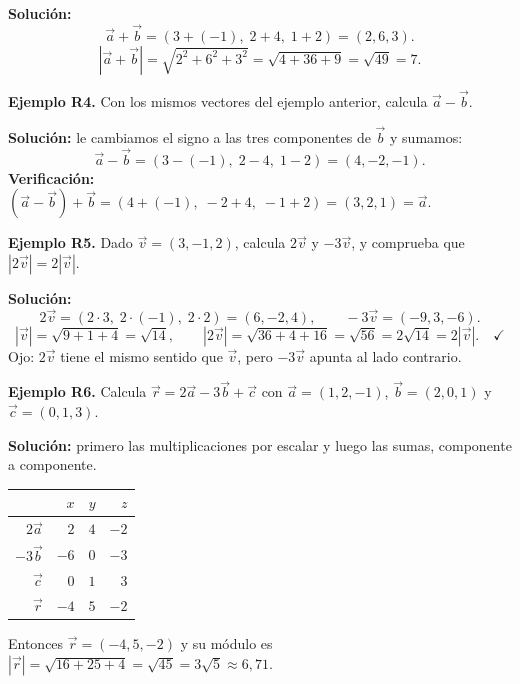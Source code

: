\documentclass[12pt, letterpaper]{article}
\begin{document}
\begin{cuadrosolucion}
  \textbf{Solución:}
  $$\vec{a} + \vec{b} = (3 + (-1),\; 2 + 4,\; 1 + 2) = (2, 6, 3).$$
  $$|\vec{a} + \vec{b}| = \sqrt{2^2 + 6^2 + 3^2} = \sqrt{4 + 36 + 9} = \sqrt{49} = 7.$$
\end{cuadrosolucion}

\textbf{Ejemplo R4.} Con los mismos vectores del ejemplo anterior, calcula $\vec{a} - \vec{b}$.

\begin{cuadrosolucion}
  \textbf{Solución:} le cambiamos el signo a las tres componentes de $\vec{b}$ y sumamos:
  $$\vec{a} - \vec{b} = (3 - (-1),\; 2 - 4,\; 1 - 2) = (4, -2, -1).$$
  \textbf{Verificación:} $(\vec{a}-\vec{b}) + \vec{b} = (4 + (-1),\; -2 + 4,\; -1 + 2) = (3, 2, 1) = \vec{a}$. \checkmark
\end{cuadrosolucion}

\textbf{Ejemplo R5.} Dado $\vec{v} = (3, -1, 2)$, calcula $2\vec{v}$ y $-3\vec{v}$, y comprueba que $|2\vec{v}| = 2|\vec{v}|$.

\begin{cuadrosolucion}
  \textbf{Solución:}
  $$2\vec{v} = (2 \cdot 3,\; 2 \cdot (-1),\; 2 \cdot 2) = (6, -2, 4), \qquad -3\vec{v} = (-9, 3, -6).$$
  $$|\vec{v}| = \sqrt{9 + 1 + 4} = \sqrt{14}, \qquad |2\vec{v}| = \sqrt{36 + 4 + 16} = \sqrt{56} = 2\sqrt{14} = 2|\vec{v}|. \quad \checkmark$$
  Ojo: $2\vec{v}$ tiene el mismo sentido que $\vec{v}$, pero $-3\vec{v}$ apunta al lado contrario.
\end{cuadrosolucion}

\textbf{Ejemplo R6.} Calcula $\vec{r} = 2\vec{a} - 3\vec{b} + \vec{c}$ con $\vec{a} = (1, 2, -1)$, $\vec{b} = (2, 0, 1)$ y $\vec{c} = (0, 1, 3)$.

\begin{cuadrosolucion}
  \textbf{Solución:} primero las multiplicaciones por escalar y luego las sumas, componente a componente.
  \begin{center}
    \begin{tabular}{rrrr}
      \toprule
      & $x$ & $y$ & $z$ \\
      \midrule
      $2\vec{a}$  & $2$  & $4$  & $-2$ \\
      $-3\vec{b}$ & $-6$ & $0$  & $-3$ \\
      $\vec{c}$   & $0$  & $1$  & $3$  \\
      \midrule
      $\vec{r}$   & $-4$ & $5$  & $-2$ \\
      \bottomrule
    \end{tabular}
  \end{center}
  Entonces $\vec{r} = (-4, 5, -2)$ y su módulo es $|\vec{r}| = \sqrt{16 + 25 + 4} = \sqrt{45} = 3\sqrt{5} \approx 6{,}71$.
\end{cuadrosolucion}
\end{document}
